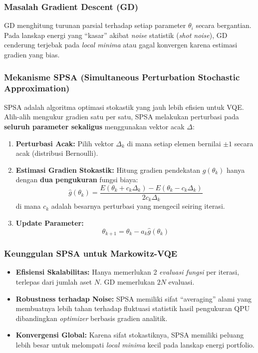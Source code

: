 \hypertarget{masalah-gradient-descent-gd}{%
\subsubsection{Masalah Gradient Descent (GD)}\label{masalah-gradient-descent-gd}}

GD menghitung turunan parsial terhadap setiap parameter \(\theta_i\) secara bergantian. Pada lanskap energi yang ``kasar'' akibat \emph{noise} statistik (\emph{shot noise}), GD cenderung terjebak pada \emph{local minima} atau gagal konvergen karena estimasi gradien yang bias.

\hypertarget{mekanisme-spsa-simultaneous-perturbation-stochastic-approximation}{%
\subsubsection{Mekanisme SPSA (Simultaneous Perturbation Stochastic Approximation)}\label{mekanisme-spsa-simultaneous-perturbation-stochastic-approximation}}

SPSA adalah algoritma optimasi stokastik yang jauh lebih efisien untuk VQE. Alih-alih mengukur gradien satu per satu, SPSA melakukan perturbasi pada \textbf{seluruh parameter sekaligus} menggunakan vektor acak \(\Delta\):

\begin{enumerate}
\def\labelenumi{\arabic{enumi}.}
\tightlist
\item
  \textbf{Perturbasi Acak:} Pilih vektor \(\Delta_k\) di mana setiap elemen bernilai \(\pm 1\) secara acak (distribusi Bernoulli).
\item
  \textbf{Estimasi Gradien Stokastik:} Hitung gradien pendekatan \(g(\theta_k)\) hanya dengan \textbf{dua pengukuran} fungsi biaya: \[ \hat{g}(\theta_k) = \frac{E(\theta_k + c_k \Delta_k) - E(\theta_k - c_k \Delta_k)}{2 c_k \Delta_k} \] di mana \(c_k\) adalah besarnya perturbasi yang mengecil seiring iterasi.
\item
  \textbf{Update Parameter:} \[ \theta_{k+1} = \theta_k - a_k \hat{g}(\theta_k) \]
\end{enumerate}

\hypertarget{keunggulan-spsa-untuk-markowitz-vqe}{%
\subsubsection{Keunggulan SPSA untuk Markowitz-VQE}\label{keunggulan-spsa-untuk-markowitz-vqe}}

\begin{itemize}
\tightlist
\item
  \textbf{Efisiensi Skalabilitas:} Hanya memerlukan 2 \emph{evaluasi fungsi} per iterasi, terlepas dari jumlah aset \(N\). GD memerlukan \(2N\) evaluasi.
\item
  \textbf{Robustness terhadap Noise:} SPSA memiliki sifat ``averaging'' alami yang membuatnya lebih tahan terhadap fluktuasi statistik hasil pengukuran QPU dibandingkan \emph{optimizer} berbasis gradien analitik.
\item
  \textbf{Konvergensi Global:} Karena sifat stokastiknya, SPSA memiliki peluang lebih besar untuk melompati \emph{local minima} kecil pada lanskap energi portfolio.
\end{itemize}


